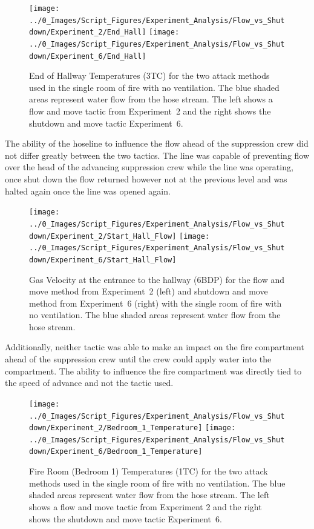 \documentclass[12pt,oneside]{book}
\begin{document}
\begin{figure}[H]
\centering
\texttt{[image: ../0\_Images/Script\_Figures/Experiment\_Analysis/Flow\_vs\_Shutdown/Experiment\_2/End\_Hall]}
\texttt{[image: ../0\_Images/Script\_Figures/Experiment\_Analysis/Flow\_vs\_Shutdown/Experiment\_6/End\_Hall]}
\caption[Hall Temp. - No Vent - Flow \& Move vs. Shutdown \& Move]{End of Hallway Temperatures (3TC) for the two attack methods used in the single room of fire with no ventilation. The blue shaded areas represent water flow from the hose stream. The left shows a flow and move tactic from Experiment~2 and the right shows the shutdown and move tactic Experiment~6.}
\label{fig:Flow_vs_Shut_Single_No_Vent_TC}
\end{figure}

The ability of the hoseline to influence the flow ahead of the suppression crew did not differ greatly between the two tactics. The line was capable of preventing flow over the head of the advancing suppression crew while the line was operating, once shut down the flow returned however not at the previous level and was halted again once the line was opened again. 

\begin{figure}[H]
\centering
\texttt{[image: ../0\_Images/Script\_Figures/Experiment\_Analysis/Flow\_vs\_Shutdown/Experiment\_2/Start\_Hall\_Flow]}
\texttt{[image: ../0\_Images/Script\_Figures/Experiment\_Analysis/Flow\_vs\_Shutdown/Experiment\_6/Start\_Hall\_Flow]}
\caption[Airflow - Single Vent - Flow \& Move vs. Shutdown \& Move]{Gas Velocity at the entrance to the hallway (6BDP) for the flow and move method from Experiment~2 (left) and shutdown and move method from Experiment~6 (right) with the single room of fire with no ventilation. The blue shaded areas represent water flow from the hose stream.}
\label{fig:Flow_vs_Shut_Single_No_Vent_Velocity_TC}
\end{figure}

Additionally, neither tactic was able to make an impact on the fire compartment ahead of the suppression crew until the crew could apply water into the compartment. The ability to influence the fire compartment was directly tied to the speed of advance and not the tactic used. 

\begin{figure}[H]
\centering
\texttt{[image: ../0\_Images/Script\_Figures/Experiment\_Analysis/Flow\_vs\_Shutdown/Experiment\_2/Bedroom\_1\_Temperature]}
\texttt{[image: ../0\_Images/Script\_Figures/Experiment\_Analysis/Flow\_vs\_Shutdown/Experiment\_6/Bedroom\_1\_Temperature]}
\caption[Bedroom 1 Temp. - Single Vent - Flow \& Move vs. Shutdown \& Move]{Fire Room (Bedroom 1) Temperatures (1TC) for the two attack methods used in the single room of fire with no ventilation. The blue shaded areas represent water flow from the hose stream. The left shows a flow and move tactic from Experiment 2 and the right shows the shutdown and move tactic Experiment~6.}
\label{fig:Flow_vs_Shut_Single_No_Vent_Fire_Temp_TC}
\end{figure}
\end{document}
